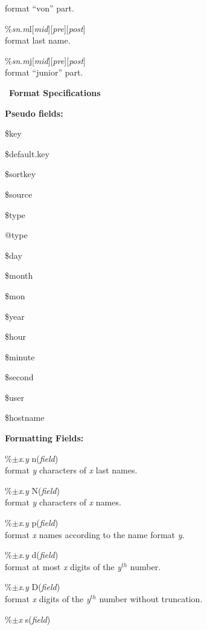 \documentclass[a4paper]{article}
\newenvironment{FlatList}{\begin{list}{}{%
      \topsep=0pt\itemsep=0pt\parsep=0pt\let\makelabel=\flatlistlabel}}{\end{list}}%
\newcommand\flatlistlabel[1]{\descriptionlabel{\sf #1}}
\newcommand\Section[1]{\smallskip\par\ \hfill{\normalsize\bf #1}\hfill\ \par}
\begin{document}
\begin{multicols}{2}
\begin{FlatList}
    format ``von'' part.
  \item [\%{\it s}{\it n}.{\it m}\/l{[{\it mid}][{\it pre}][{\it post}]}]\ \\
    format last name.
  \item [\%{\it s}{\it n}.{\it m}\/j{[{\it mid}][{\it pre}][{\it post}]}]\ \\
    format ``junior'' part.
  \end{FlatList}
  \Section{Format Specifications}
  \textbf{Pseudo fields:} 
  \begin{FlatList}
  \item [\$key]
  \item [\$default.key]
  \item [\$sortkey]
  \item [\$source]
  \item [\$type]
  \item [@type]
  \item [\$day]
  \item [\$month]
  \item [\$mon]
  \item [\$year]
  \item [\$hour]
  \item [\$minute]
  \item [\$second]
  \item [\$user]
  \item [\$hostname]
  \end{FlatList}
  \textbf{Formatting Fields:} 
  \begin{FlatList}
  \item [\%$\pm ${\it x}.{\it y}\/ n({\it field}\/)]\ \\
    format {\it y}\/ characters of {\it x}\/ last names.
  \item [\%$\pm ${\it x}.{\it y}\/ N({\it field}\/)]\ \\
    format {\it y}\/ characters of {\it x}\/ names.
  \item [\%$\pm ${\it x}.{\it y}\/ p({\it field}\/)]\ \\
    format {\it x}\/ names according to the name format {\it y}.
  \item [\%$\pm ${\it x}.{\it y}\/ d({\it field}\/)]\ \\
    format at most {\it x}\/ digits of the {\it y}$^{th}$ number.
  \item [\%$\pm ${\it x}.{\it y}\/ D({\it field}\/)]\ \\
    format {\it x}\/ digits of the {\it y}$^{th}$ number without truncation.
  \item [\%$\pm ${\it x}\/ s({\it field}\/)]\ \\

\end{FlatList}
\end{multicols}
\end{document}
